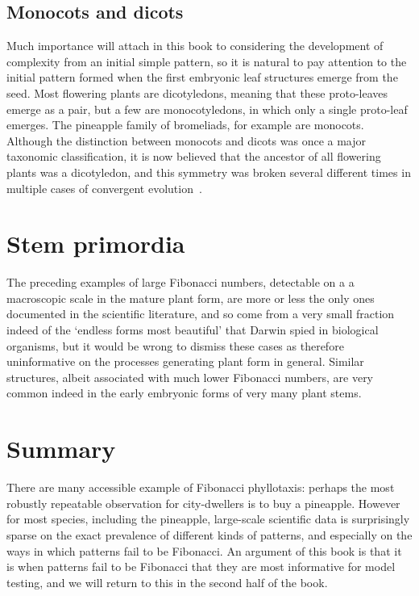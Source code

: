 \subsection{Monocots and dicots}
Much importance will attach in this book to considering the development of complexity from an initial simple pattern, so it is natural to pay attention to the initial pattern formed when the first embryonic leaf structures emerge from the seed. Most flowering plants are dicotyledons, meaning that these proto-leaves emerge as a pair, but a few are monocotyledons, in which 
only a single proto-leaf emerges. The pineapple family of bromeliads, for example are monocots. Although the distinction between monocots and dicots was once a major taxonomic classification, it is now believed that the ancestor of all flowering plants was a dicotyledon, and this symmetry was broken several different times in multiple cases of convergent evolution~\cite{ingrouillePlantsDiversityEvolution2006}. 


\section{Stem primordia}
The preceding examples of large Fibonacci numbers, detectable on a a macroscopic scale in the mature plant form, are more or less the only ones documented in the scientific literature, and so come from a very small fraction indeed of the `endless forms most beautiful' that Darwin spied in biological organisms, but it would be wrong to dismiss these cases as therefore uninformative on the processes generating plant form in general. Similar structures, albeit associated with much lower Fibonacci numbers, are very common indeed in the early embryonic forms of very many plant stems. 
\newpage

 \section{Summary}
 There are many accessible example of Fibonacci phyllotaxis: perhaps the most robustly repeatable observation for city-dwellers is to buy a pineapple. However for most species, including the pineapple,  large-scale scientific data is surprisingly sparse on the exact prevalence of different kinds of patterns, and especially on the ways in which patterns fail to be Fibonacci. An argument of this book is that it is when patterns fail to be Fibonacci that they are most informative for model testing, and we will return to this in the second half of the book. 
\jEndChapter